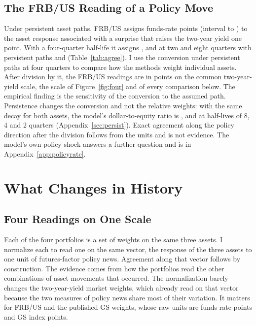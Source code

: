 \documentclass[11pt]{article}
\begin{document}
\subsection{The FRB/US Reading of a Policy Move}\label{sec:onannounce}
Under persistent asset paths, FRB/US assigns  funds-rate points (interval  to ) to the asset response associated with a surprise that raises the two-year yield one point. With a four-quarter half-life it assigns , and at two and eight quarters with persistent paths  and  (Table~\ref{tab:agree}). I use the conversion under persistent paths at four quarters to compare how the methods weight individual assets. After division by it, the FRB/US readings are in points on the common two-year-yield scale, the scale of Figure~\ref{fig:four} and of every comparison below. The empirical finding is the sensitivity of the conversion to the assumed path. Persistence changes the conversion and not the relative weights: with the same decay for both assets, the model's dollar-to-equity ratio is ,  and  at half-lives of 8, 4 and 2 quarters (Appendix~\ref{sec:persist}). Exact agreement along the policy direction after the division follows from the units and is not evidence. The model's own policy shock answers a further question and is in Appendix~\ref{app:policyrate}.


\section{What Changes in History}\label{sec:history}
\subsection{Four Readings on One Scale}\label{sec:size}
Each of the four portfolios is a set of weights on the same three assets. I normalize each to read one on the same vector, the response of the three assets to one unit of futures-factor policy news. Agreement along that vector follows by construction. The evidence comes from how the portfolios read the other combinations of asset movements that occurred. The normalization barely changes the two-year-yield market weights, which already read  on that vector because the two measures of policy news share most of their variation. It matters for FRB/US and the published GS weights, whose raw units are funds-rate points and GS index points.
\end{document}
